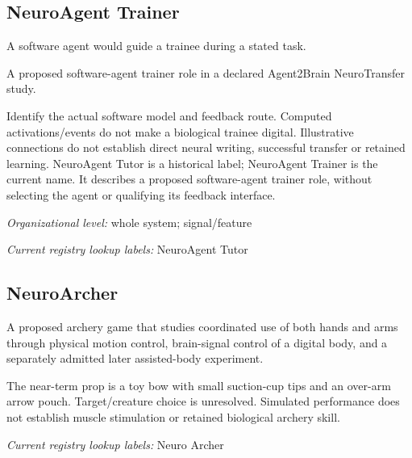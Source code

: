 \subsection*{NeuroAgent Trainer}
\noindent A software agent would guide a trainee during a stated task.\par
\noindent A proposed software-agent trainer role in a declared Agent2Brain NeuroTransfer study.\par
\noindent Identify the actual software model and feedback route. Computed activations/events do not make a biological trainee digital. Illustrative connections do not establish direct neural writing, successful transfer or retained learning. NeuroAgent Tutor is a historical label; NeuroAgent Trainer is the current name. It describes a proposed software-agent trainer role, without selecting the agent or qualifying its feedback interface.\par
\noindent\textit{Organizational level:} whole system; signal/feature\par

\noindent\textit{Current registry lookup labels:} NeuroAgent Tutor\par

\begin{samepage}
\subsection*{NeuroArcher}
\noindent A proposed archery game that studies coordinated use of both hands and arms through physical motion control, brain-signal control of a digital body, and a separately admitted later assisted-body experiment.\par
\end{samepage}
\noindent The near-term prop is a toy bow with small suction-cup tips and an over-arm arrow pouch. Target/creature choice is unresolved. Simulated performance does not establish muscle stimulation or retained biological archery skill.\par





\noindent\textit{Current registry lookup labels:} Neuro Archer\par


